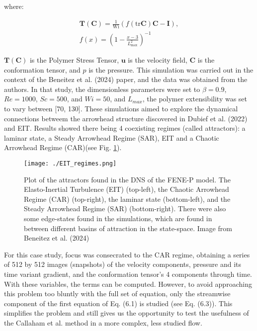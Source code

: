 \documentclass[12pt]{report} %
\begin{document}
where:

\begin{equation}
  \begin{aligned}
    \mathbf{T}(\mathbf{C}) = \frac{1}{\text{Wi}} \left(f(\text{tr}\mathbf{C})\mathbf{C} - \mathbf{I}\right), \\
    f(x) = \left(1 - \frac{x - 3}{L_{\text{max}}^2}\right)^{-1}
  \end{aligned}
\end{equation}

$\mathbf{T}(\mathbf{C})$ is the Polymer Stress Tensor, $\mathbf{u}$ is the velocity field, $\mathbf{C}$ is the conformation tensor, and $p$ is the pressure. This simulation was carried out in the context of the Beneitez et al. (2024) paper\cite{beneitez2024multistability}, and the data was obtained from the authors. In that study, the dimensionless parameters were set to $\beta = 0.9$, $Re = 1000$, $Sc = 500$, and $Wi = 50$, and $L_{max}$, the polymer extensibility was set to vary between [70, 130]. These simulations aimed to explore the dynamical connections betweem the arrowhead structure discovered in Dubief et al. (2022)\cite{dubief2022first} and EIT. Results showed there being 4 coexisting regimes (called attractors): a laminar state, a Steady Arrowhead Regime (SAR), EIT and a Chaotic Arrowhead Regime (CAR)(see Fig. \ref{fig:attractors}).

\begin{figure}
  \centering
  \texttt{[image: ./EIT\_regimes.png]}
  \caption{Plot of the attractors found in the DNS of the FENE-P model. The Elasto-Inertial Turbulence (EIT) (top-left), the Chaotic Arrowhead Regime (CAR) (top-right), the laminar state (bottom-left), and the Steady Arrowhead Regime (SAR) (bottom-right). There were also some edge-states found in the simulations, which are found in between different basins of attraction in the state-space. Image from Beneitez et al. (2024)\cite{beneitez2024multistability}}
  \label{fig:attractors}
\end{figure}

For this case study, focus was consecrated to the CAR regime, obtaining a series of 512 by 512 images (snapshots) of the velocity components, pressure and its time variant gradient, and the conformation tensor's 4 components through time. With these variables, the terms can be computed. However, to avoid approaching this problem too bluntly with the full set of equation, only the streamwise component of the first equation of Eq. (6.1) is studied (see Eq. (6.3)). This simplifies the problem and still gives us the opportunity to test the usefulness of the Callaham et al. method in a more complex, less studied flow.
\end{document}
